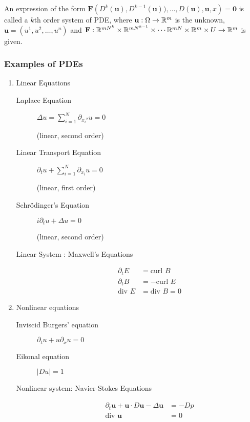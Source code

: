\begin{definition}
An expression of the form $\mathbf{F} \left( D^k (\mathbf{u}), D^{k-1} (\mathbf {u})), \ldots , D (\mathbf{u}), \mathbf{u} , x \right)=\mathbf{0}$ is called a $k$th order system of PDE, where $\mathbf{u} : \Omega \to \mathbb R ^m$ is the unknown, $\mathbf{u}= \left( u^1 , u^2 , \ldots, u^n \right)$ and $\mathbf{F} : \mathbb R ^{mN^k} \times \mathbb R ^{mN^{k-1}} \times \cdots \mathbb R ^{mN} \times \mathbb R ^m \times U \to \mathbb R ^m$ is given.
    \label{def:system-of-pde}
\end{definition}



\subsubsection{Examples of PDEs}
\begin{enumerate}

    \item Linear Equations
	\begin{description}
	    \item[Laplace Equation] $\Delta u = \sum_{i=1}^{N} \partial _{{x_i}^{2}} u =0$ \begin{flushright}(linear, second order)\end{flushright}

	    \item [Linear Transport Equation] $\partial_t u + \sum_{i=1}^{N} \partial_{x_i} u =0$ \begin{flushright}(linear, first order)\end{flushright}

	    \item [Schrödinger's Equation] $i \partial_{t} u + \Delta u =0$ \begin{flushright}(linear, second order)\end{flushright}

	    \item [Linear System : Maxwell's Equations]
		\begin{align*}
		    \partial_t E &=\text{curl } B \\
		    \partial_t B &= - \text{curl } E \\
		    \text{div } E &= \text{div } B =0
		\end{align*}

	\end{description}

    \item Nonlinear equations
	\begin{description}
	    \item[Inviscid Burgers' equation] $\partial_{t} u + u \partial _x u = 0$
	    \item [Eikonal equation] $|Du| = 1$
	    \item [Nonlinear system: Navier-Stokes Equations] \begin{align*}\partial _t \mathbf{u} + \mathbf{u} \cdot D\mathbf{u} - \Delta \mathbf{u} &= -Dp  \\ \text{div } \mathbf{u} &=0\end{align*}
	\end{description}

\end{enumerate}

